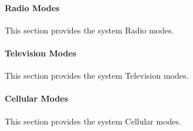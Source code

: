 \paragraph{Radio Modes}
\label{loc:MediumRadioModes}

This section provides the system Radio modes.




\paragraph{Television Modes}
\label{loc:MediumTVModes}

This section provides the system Television modes.




\paragraph{Cellular Modes}
\label{loc:MediumCellModes}

This section provides the system Cellular modes.

